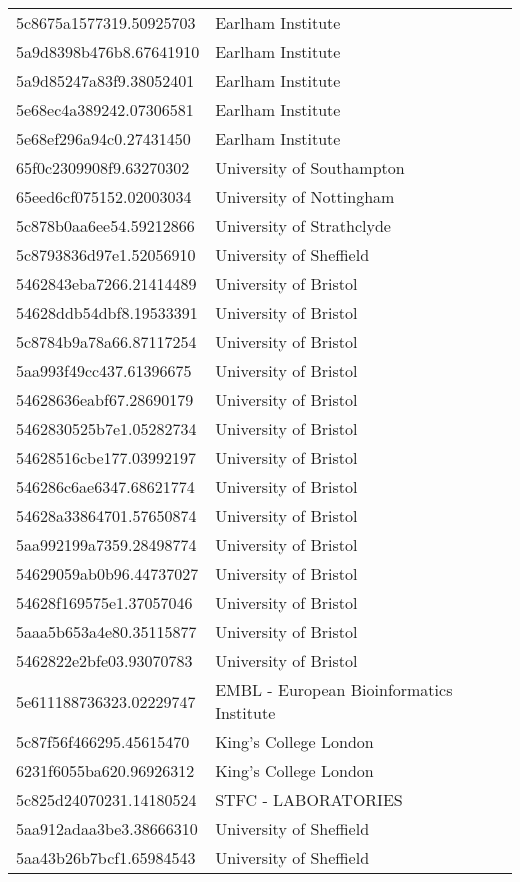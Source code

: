 \begin{tabular}{ll}
5c8675a1577319.50925703 & Earlham Institute \\
5a9d8398b476b8.67641910 & Earlham Institute \\
5a9d85247a83f9.38052401 & Earlham Institute \\
5e68ec4a389242.07306581 & Earlham Institute \\
5e68ef296a94c0.27431450 & Earlham Institute \\
65f0c2309908f9.63270302 & University of Southampton \\
65eed6cf075152.02003034 & University of Nottingham \\
5c878b0aa6ee54.59212866 & University of Strathclyde \\
5c8793836d97e1.52056910 & University of Sheffield \\
5462843eba7266.21414489 & University of Bristol \\
54628ddb54dbf8.19533391 & University of Bristol \\
5c8784b9a78a66.87117254 & University of Bristol \\
5aa993f49cc437.61396675 & University of Bristol \\
54628636eabf67.28690179 & University of Bristol \\
5462830525b7e1.05282734 & University of Bristol \\
54628516cbe177.03992197 & University of Bristol \\
546286c6ae6347.68621774 & University of Bristol \\
54628a33864701.57650874 & University of Bristol \\
5aa992199a7359.28498774 & University of Bristol \\
54629059ab0b96.44737027 & University of Bristol \\
54628f169575e1.37057046 & University of Bristol \\
5aaa5b653a4e80.35115877 & University of Bristol \\
5462822e2bfe03.93070783 & University of Bristol \\
5e611188736323.02229747 & EMBL - European Bioinformatics Institute \\
5c87f56f466295.45615470 & King's College London \\
6231f6055ba620.96926312 & King's College London \\
5c825d24070231.14180524 & STFC - LABORATORIES \\
5aa912adaa3be3.38666310 & University of Sheffield \\
5aa43b26b7bcf1.65984543 & University of Sheffield \\

\end{tabular}
